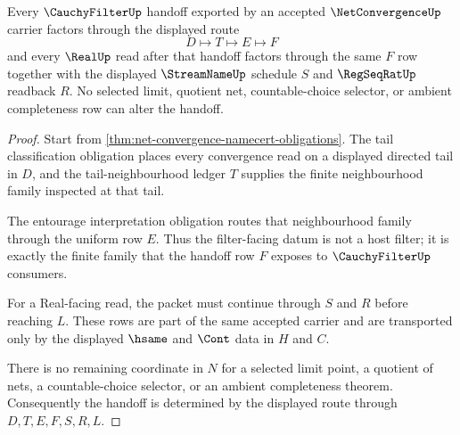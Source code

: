 \begin{theorem}
\label{thm:net-convergence-cauchy-filter-handoff}
Every $\CauchyFilterUp$ handoff exported by an accepted $\NetConvergenceUp$ carrier factors through the displayed route
$$
D\longmapsto T\longmapsto E\longmapsto F
$$
and every $\RealUp$ read after that handoff factors through the same $F$ row together with the displayed $\StreamNameUp$ schedule $S$ and $\RegSeqRatUp$ readback $R$. No selected limit, quotient net, countable-choice selector, or ambient completeness row can alter the handoff.
\end{theorem}
\begin{proof}
Start from \autoref{thm:net-convergence-namecert-obligations}. The tail classification obligation places every convergence read on a displayed directed tail in $D$, and the tail-neighbourhood ledger $T$ supplies the finite neighbourhood family inspected at that tail.

The entourage interpretation obligation routes that neighbourhood family through the uniform row $E$. Thus the filter-facing datum is not a host filter; it is exactly the finite family that the handoff row $F$ exposes to $\CauchyFilterUp$ consumers.

For a Real-facing read, the packet must continue through $S$ and $R$ before reaching $L$. These rows are part of the same accepted carrier and are transported only by the displayed $\hsame$ and $\Cont$ data in $H$ and $C$.

There is no remaining coordinate in $N$ for a selected limit point, a quotient of nets, a countable-choice selector, or an ambient completeness theorem. Consequently the handoff is determined by the displayed route through $D,T,E,F,S,R,L$.
\end{proof}

